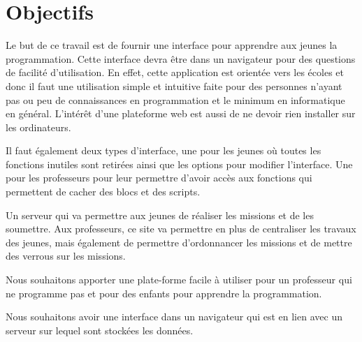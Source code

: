 \section{Objectifs}
\label{intro-objectifs}
Le but de ce travail est de fournir une interface pour apprendre aux jeunes la programmation. Cette interface devra être dans un navigateur pour des questions de facilité d'utilisation. En effet, cette application est orientée vers les écoles et donc il faut une utilisation simple et intuitive faite pour des personnes n'ayant pas ou peu de connaissances en programmation et le minimum en informatique en général. L'intérêt d'une plateforme web est aussi de ne devoir rien installer sur les ordinateurs.

Il faut également deux types d'interface, une pour les jeunes où toutes les fonctions inutiles sont retirées ainsi que les options pour modifier l'interface. Une pour les professeurs pour leur permettre d'avoir accès aux fonctions qui permettent de cacher des blocs et des scripts.

Un serveur qui va permettre aux jeunes de réaliser les missions et de les soumettre. Aux professeurs, ce site va permettre en plus de centraliser les travaux des jeunes, mais également de permettre d'ordonnancer les missions et de mettre des verrous sur les missions.

Nous souhaitons apporter une plate-forme facile à utiliser pour un professeur qui ne programme pas et pour des enfants pour apprendre la programmation. 

Nous souhaitons avoir une interface dans un navigateur qui est en lien avec un serveur sur lequel sont stockées les données.
